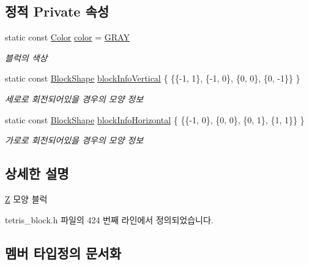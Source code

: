 \subsection*{정적 Private 속성}
\begin{DoxyCompactItemize}
\item 
static const \mbox{\hyperlink{class_block_ad054b4ac51df79aa910040b2a2fdf7b5}{Color}} \mbox{\hyperlink{class_z_aee843d60621178a7ea41811477311b8d}{color}} = \mbox{\hyperlink{class_block_ad054b4ac51df79aa910040b2a2fdf7b5a1158efe2e537f0b96f9ea590f22ab821}{G\+R\+AY}}
\begin{DoxyCompactList}\small\item\em 블럭의 색상 \end{DoxyCompactList}\item 
static const \mbox{\hyperlink{class_block_aca5d951639f113e2ebd7856209d6b9ab}{Block\+Shape}} \mbox{\hyperlink{class_z_abf77b0c1e705c62c51396f55579a8fa3}{block\+Info\+Vertical}} \{ \{\{-\/1, 1\}, \{-\/1, 0\}, \{0, 0\}, \{0, -\/1\}\} \}
\begin{DoxyCompactList}\small\item\em 세로로 회전되어있을 경우의 모양 정보 \end{DoxyCompactList}\item 
static const \mbox{\hyperlink{class_block_aca5d951639f113e2ebd7856209d6b9ab}{Block\+Shape}} \mbox{\hyperlink{class_z_a2e59d23428e1ad155832c0f5a118e25e}{block\+Info\+Horizontal}} \{ \{\{-\/1, 0\}, \{0, 0\}, \{0, 1\}, \{1, 1\}\} \}
\begin{DoxyCompactList}\small\item\em 가로로 회전되어있을 경우의 모양 정보 \end{DoxyCompactList}\end{DoxyCompactItemize}


\subsection{상세한 설명}
\mbox{\hyperlink{class_z}{Z}} 모양 블럭 

tetris\+\_\+block.\+h 파일의 424 번째 라인에서 정의되었습니다.



\subsection{멤버 타입정의 문서화}
\mbox{\label{class_block_aca5d951639f113e2ebd7856209d6b9ab}} 
